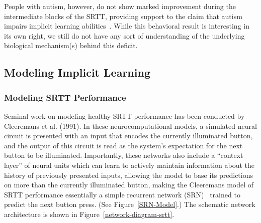 People with autism, however, do not show marked improvement during the intermediate blocks of the SRTT, providing support to the claim that autism impairs implicit learning abilities~\cite{RefWorks:148}.  While this behavioral result is interesting in its own right, we still do not have any sort of understanding of the underlying biological mechanism(s) behind this deficit.


\subsection{Modeling Implicit Learning}

\subsubsection{Modeling SRTT Performance}
Seminal work on modeling healthy SRTT performance has been conducted by \nocite{Cleeremans:1991:SSRT} Cleeremans et al. (1991).  In these neurocomputational models, a simulated neural circuit is presented with an input that encodes the currently illuminated button, and the output of this circuit is read as the system's expectation for the next button to be illuminated.  Importantly, these networks also include a ``context layer'' of neural units which can learn to actively maintain information about the history of previously presented inputs, allowing the model to base its predictions on more than the currently illuminated button, making the Cleeremans model of SRTT performance essentially a simple recurrent network (SRN)~\cite{ElmanJ:1990:SRN} trained to predict the next button press. (See Figure~\ref{SRN-Model}.) The schematic network architecture is shown in Figure~\ref{network-diagram-srtt}.  

